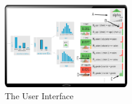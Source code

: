 \begin{figure}
\centering
\includegraphics[width=0.48\textwidth]{figures/risk_controller}
\caption{The \system{} User Interface}
\label{fig:ui}	
\end{figure}

